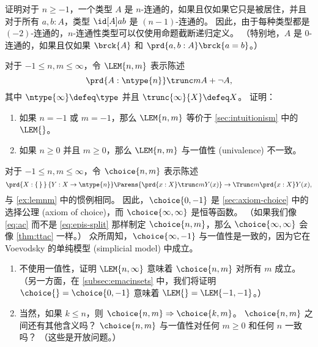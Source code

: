 \begin{ex}\label{ex:connectivity-inductively}
证明对于 $n\ge -1$，一个类型 $A$ 是 $n$-连通的，如果且仅如果它只是被居住，并且对于所有 $a,b:A$，类型 $\id[A]ab$ 是 $(n-1)$-连通的。
因此，由于每种类型都是 $(-2)$-连通的，$n$-连通性类型可以仅使用命题截断递归定义。
（特别地，$A$ 是 0-连通的，如果且仅如果 $\brck{A}$ 和 $\prd{a,b:A} \brck{a=b}$。）
\end{ex}

\begin{ex}\label{ex:lemnm}
%
对于 $-1\le n,m \le\infty$，令 $\LEM{n,m}$ 表示陈述
\[ \prd{A:\ntype{n}} \trunc m{A + \neg A},\]
其中 $\ntype{\infty} \defeq \type$ 并且 $\trunc{\infty}{X}\defeq X$。
证明：
\begin{enumerate}
    \item 如果 $n=-1$ 或 $m=-1$，那么 $\LEM{n,m}$ 等价于 \cref{sec:intuitionism} 中的 $\LEM{}$。
    \item 如果 $n\ge 0$ 并且 $m\ge 0$，那么 $\LEM{n,m}$ 与一值性 (univalence) 不一致。
\end{enumerate}
\end{ex}

\begin{ex}\label{ex:acnm}
%
对于 $-1\le n,m\le\infty$，令 $\choice{n,m}$ 表示陈述
\[ \prd{X:\set}{Y:X\to\ntype{n}}
\Parens{\prd{x:X} \trunc m{Y(x)}}
\to
\Trunc m{\prd{x:X} Y(x)},
\]
与 \cref{ex:lemnm} 中的惯例相同。
因此，$\choice{0,-1}$ 是 \cref{sec:axiom-choice} 中的选择公理 (axiom of choice)，而 $\choice{\infty,\infty}$ 是恒等函数。
（如果我们像 \eqref{eq:ac} 而不是 \eqref{eq:epis-split} 那样制定 $\choice{n,m}$，那么 $\choice{\infty,\infty}$ 会像 \cref{thm:ttac} 一样。）
众所周知，$\choice{\infty,-1}$ 与一值性是一致的，因为它在 Voevodsky 的单纯模型 (simplicial model) 中成立。
\begin{enumerate}
    \item 不使用一值性，证明 $\LEM{n,\infty}$ 意味着 $\choice{n,m}$ 对所有 $m$ 成立。
    （另一方面，在 \cref{subsec:emacinsets} 中，我们将证明 $\choice{}=\choice{0,-1}$ 意味着 $\LEM{}=\LEM{-1,-1}$。）
    \item 当然，如果 $k\le n$，则 $\choice{n,m}\Rightarrow \choice{k,m}$。
    $\choice{n,m}$ 之间还有其他含义吗？
    $\choice{n,m}$ 与一值性对任何 $m\ge 0$ 和任何 $n$ 一致吗？
    （这些是开放问题。）
\end{enumerate}
\end{ex}

